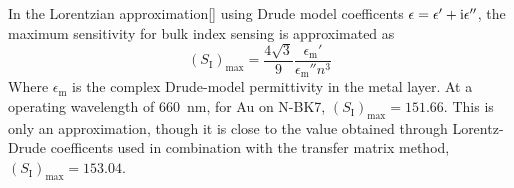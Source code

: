 In the Lorentzian approximation{[}{]} using Drude model coefficents
$\epsilon=\epsilon'+{\mathrm{i}}\epsilon''$, the maximum sensitivity for bulk
index sensing is approximated as
\begin{equation}
(S_{\text{I}})_{\text{max}}=\frac{4\sqrt{3}}{9}\frac{\epsilon_{\mathrm{m}}'}{\epsilon_{\mathrm{m}}''n^{3}}
\end{equation}
Where $\epsilon_{\mathrm{m}}$ is the complex Drude-model permittivity
in the metal layer. At a operating wavelength of \SI{660}{\nano\meter},
for Au on N-BK7, $(S_{\mathrm{I}})_{\text{max}}=151.66$. This is
only an approximation, though it is close to the value obtained through
Lorentz-Drude coefficents used in combination with the transfer matrix
method, $(S_{\mathrm{I}})_{\text{max}}=153.04$.

